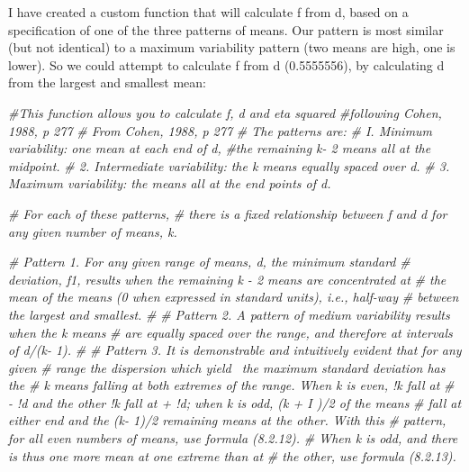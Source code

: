 \documentclass[]{book}
\newenvironment{Shaded}{\begin{snugshade}}{\end{snugshade}}
\newcommand{\CommentTok}[1]{\textcolor[rgb]{0.56,0.35,0.01}{\textit{#1}}}
\begin{document}
I have created a custom function that will calculate f from d, based on a specification of one of the three patterns of means. Our pattern is most similar (but not identical) to a maximum variability pattern (two means are high, one is lower). So we could attempt to calculate f from d (0.5555556), by calculating d from the largest and smallest mean:

\begin{Shaded}
\begin{Highlighting}[]
\CommentTok{#This function allows you to calculate f, d and eta squared }
\CommentTok{#following Cohen, 1988, p 277}
\CommentTok{# From Cohen, 1988, p 277}
\CommentTok{# The patterns are:}
\CommentTok{# I. Minimum variability: one mean at each end of d, }
\CommentTok{#the remaining k- 2 means all at the midpoint.}
\CommentTok{# 2. Intermediate variability: the k means equally spaced over d.}
\CommentTok{# 3. Maximum variability: the means all at the end points of d.}

\CommentTok{# For each of these patterns, }
\CommentTok{# there is a fixed relationship between f and d for any given number of means, k.}

\CommentTok{# Pattern 1. For any given range of means, d, the minimum standard}
\CommentTok{# deviation, f1, results when the remaining k - 2 means are concentrated at}
\CommentTok{# the mean of the means (0 when expressed in standard units), i.e., half-way}
\CommentTok{# between the largest and smallest.}
\CommentTok{# }
\CommentTok{# Pattern 2. A pattern of medium variability results when the k means}
\CommentTok{# are equally spaced over the range, and therefore at intervals of d/(k- 1).}
\CommentTok{# }
\CommentTok{# Pattern 3. It is demonstrable and intuitively evident that for any given}
\CommentTok{# range the dispersion which yield~ the maximum standard deviation has the}
\CommentTok{# k means falling at both extremes of the range. When k is even, !k fall at}
\CommentTok{# - !d and the other !k fall at + !d; when k is odd, (k + I )/2 of the means}
\CommentTok{# fall at either end and the (k- 1)/2 remaining means at the other. With this}
\CommentTok{# pattern, for all even numbers of means, use formula (8.2.12).}
\CommentTok{# When k is odd, and there is thus one more mean at one extreme than at}
\CommentTok{# the other, use formula (8.2.13).}


\end{Highlighting}
\end{Shaded}
\end{document}
